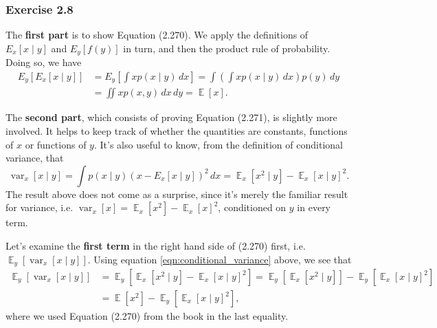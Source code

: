\documentclass[12pt, a4paper]{article}
\DeclareMathOperator{\E}{\mathbb{E}}
\DeclareMathOperator{\var}{\operatorname{var}}
\begin{document}
\subsubsection*{Exercise 2.8}
The \textbf{first part} is to show Equation (2.270). 
We apply the definitions of $E_x \left[ x \mid y \right]$ and $E_y [f(y)]$ in turn, and then the product rule of probability.
Doing so, we have
\begin{align*}
	E_y \left[ E_x \left[ x \mid y \right]  \right] &= 
	E_y \left[ \int x p (x \mid y) \, dx  \right] 
	= \int \left( \int x p (x \mid y) \, dx \right)  p(y) \, dy \\
	&=  \iint x p(x, y) \, dx \, dy = \E[x].
\end{align*}

The \textbf{second part}, which consists of proving Equation (2.271), is slightly more involved.
It helps to keep track of whether the quantities are constants, functions of $x$ or functions of $y$.
It's also useful to know, from the definition of conditional variance, that
\begin{equation}
\label{eqn:conditional_variance}
	\var_x[ x \mid y ] 
	=
	\int p(x \mid y) \left( x - E_x \left[ x \mid y \right] \right)^2 \, dx
	=
	 \E_x [x^2 \mid y] - \E_x [x \mid y]^2.
\end{equation}
The result above does not come as a surprise, since it's merely the familiar result for variance, i.e. $\var_x[ x ] = \E_x [x^2] - \E_x [x ]^2$, conditioned on $y$ in every term.

Let's examine the \textbf{first term} in the right hand side of (2.270) first, i.e. $\E_y \left[ \var_x[ x \mid y ]  \right]$.
Using equation \eqref{eqn:conditional_variance} above, we see that
\begin{align}
	\nonumber \E_y \left[ \var_x[ x \mid y ]  \right] &=  \E_y \left[ \E_x [x^2 \mid y] - \E_x [x \mid y]^2  \right]
	=
	\E_y \left[ \E_x [x^2 \mid y] \right] - \E_y \left[ \E_x [x \mid y]^2  \right] \\
	\label{eqn:ch2_prob8a} &= \E[x^2] - \E_y \left[ \E_x [x \mid y]^2  \right],
\end{align}
where we used Equation (2.270) from the book in the last equality.
\end{document}
